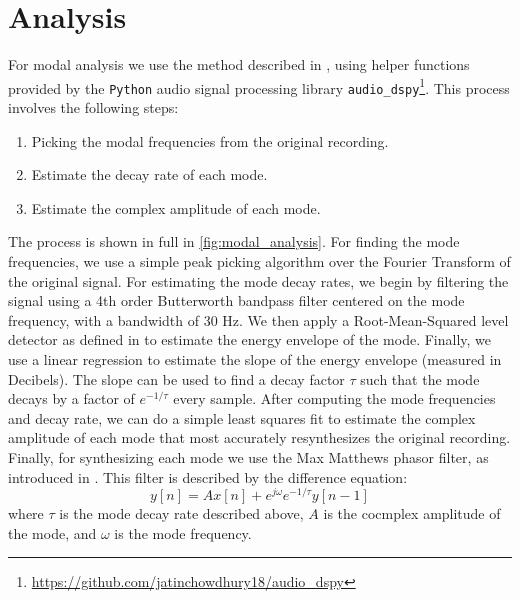 \documentclass[twoside,a4paper]{article}
\begin{document}
\section{Analysis} \label{sec:analysis}
%
For modal analysis we use the method described in
\cite{canfielddafilou:werner:bellEffects:2017}, using helper functions
provided by the \texttt{Python} audio signal processing library
\texttt{audio\_dspy}\footnote{\url{https://github.com/jatinchowdhury18/audio_dspy}}.
This process involves the following steps:
\begin{enumerate}
    \item Picking the modal frequencies from the original recording.
    \item Estimate the decay rate of each mode.
    \item Estimate the complex amplitude of each mode.
\end{enumerate}
%
The process is shown in  full in \cref{fig:modal_analysis}.
\newline\newline
For finding the mode frequencies, we use a simple peak picking
algorithm over the Fourier Transform of the original signal.
\newline\newline
For estimating the mode decay rates, we begin by filtering
the signal using a 4th order Butterworth bandpass filter
centered on the mode frequency, with a bandwidth of 30 Hz.
We then apply a Root-Mean-Squared level detector as defined
in \cite{giannoulis2012compressor} to estimate the energy
envelope of the mode. Finally, we use a linear regression
to estimate the slope of the energy envelope (measured in
Decibels). The slope can be used to find a decay
factor $\tau$ such that the mode decays by a factor of
$e^{-1/\tau}$ every sample.
\newline\newline
After computing the mode frequencies and decay
rate, we can do a simple least squares fit to
estimate the complex amplitude of each mode that
most accurately resynthesizes the original recording.
\newline\newline
Finally, for synthesizing each mode we use the Max Matthews
phasor filter, as introduced in \cite{phasorfilter}.
This filter is described by the difference equation:
\begin{equation}
    y[n] = A x[n] + e^{j\omega} e^{-1/\tau} y[n-1]
\end{equation}
%
where $\tau$ is the mode decay rate described above, $A$ is
the cocmplex amplitude of the mode, and $\omega$ is the mode
frequency.
\end{document}
